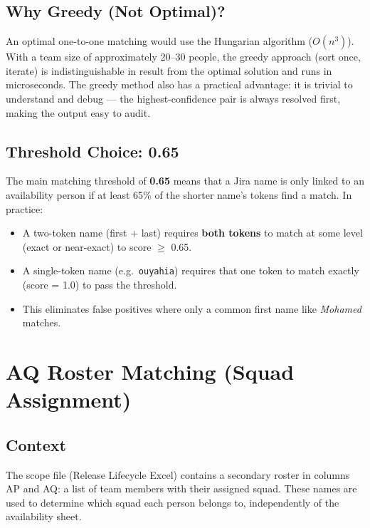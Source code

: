 \documentclass[12pt, a4paper]{article}
\begin{document}
\subsection{Why Greedy (Not Optimal)?}

An optimal one-to-one matching would use the Hungarian algorithm ($O(n^3)$). With a team
size of approximately 20--30 people, the greedy approach (sort once, iterate) is
indistinguishable in result from the optimal solution and runs in microseconds.
The greedy method also has a practical advantage: it is trivial to understand and debug
— the highest-confidence pair is always resolved first, making the output easy to audit.

\subsection{Threshold Choice: 0.65}

The main matching threshold of \textbf{0.65} means that a Jira name is only linked to an
availability person if at least 65\% of the shorter name's tokens find a match. In practice:

\begin{itemize}
    \item A two-token name (first + last) requires \textbf{both tokens} to match at
          some level (exact or near-exact) to score $\geq$ 0.65.
    \item A single-token name (e.g.\ \texttt{ouyahia}) requires that one token to match
          exactly (score = 1.0) to pass the threshold.
    \item This eliminates false positives where only a common first name like
          \textit{Mohamed} matches.
\end{itemize}

\section{AQ Roster Matching (Squad Assignment)}

\subsection{Context}

The scope file (Release Lifecycle Excel) contains a secondary roster in columns AP and AQ:
a list of team members with their assigned squad. These names are used to determine which
squad each person belongs to, independently of the availability sheet.
\end{document}

